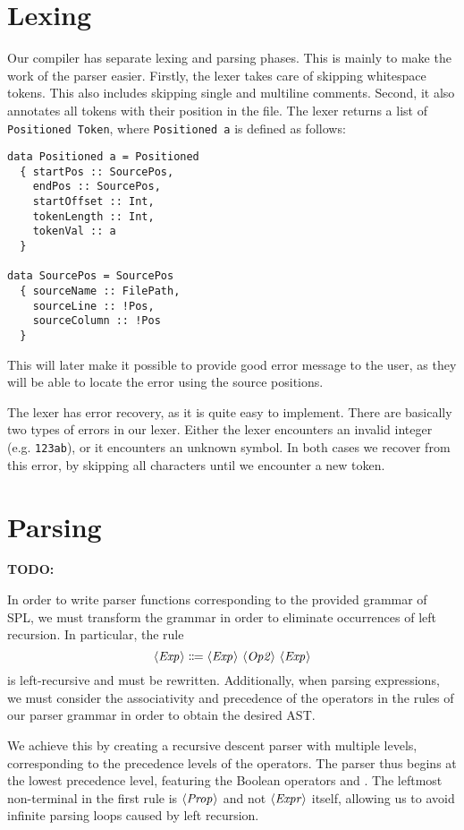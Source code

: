 \documentclass{report}
\begin{document}
\section{Lexing}
Our compiler has separate lexing and parsing phases.
This is mainly to make the work of the parser easier.
Firstly, the lexer takes care of skipping whitespace tokens.
This also includes skipping single and multiline comments.
Second, it also annotates all tokens with their position in the file.
The lexer returns a list of \texttt{Positioned Token},
where \texttt{Positioned a} is defined as follows:
\begin{verbatim}
data Positioned a = Positioned
  { startPos :: SourcePos,
    endPos :: SourcePos,
    startOffset :: Int,
    tokenLength :: Int,
    tokenVal :: a
  }

data SourcePos = SourcePos
  { sourceName :: FilePath,
    sourceLine :: !Pos,
    sourceColumn :: !Pos
  }
\end{verbatim}
This will later make it possible to provide good error message to the user,
as they will be able to locate the error using the source positions.

The lexer has error recovery, as it is quite easy to implement.
There are basically two types of errors in our lexer.
Either the lexer encounters an invalid integer (e.g. \verb|123ab|),
or it encounters an unknown symbol.
In both cases we recover from this error, by skipping all characters until we
encounter a new token.

\section{Parsing}
\textbf{TODO:}

In order to write parser functions corresponding to the provided grammar of SPL,
we must transform the grammar in order to eliminate occurrences of left
recursion.
In particular, the rule
\[ \NT{Exp} \Coloneqq \NT{Exp}\ \NT{Op2}\ \NT{Exp} \]
is left-recursive and must be rewritten.
Additionally, when parsing expressions, we must consider the associativity and
precedence of the operators in the rules of our parser grammar in order to
obtain the desired AST.

We achieve this by creating a recursive descent parser with multiple levels,
corresponding to the precedence levels of the operators.
The parser thus begins at the lowest precedence level, featuring the Boolean
operators \code{\&\&} and \code{||}.
The leftmost non-terminal in the first rule is $\langle \textit{Prop}\kern.7pt \rangle$ and not $\langle \textit{Expr}\kern.7pt \rangle$
itself, allowing us to avoid infinite parsing loops caused by left recursion.
\end{document}
